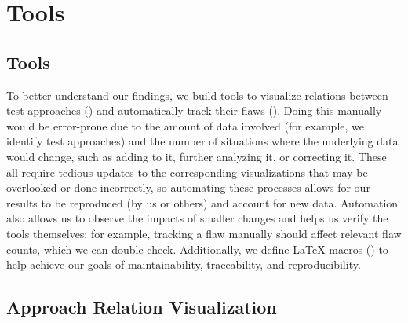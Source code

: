 \ifnotpaper\section{Tools}
\else\subsection{Tools}
\fi\label{tools}

\ifnotpaper
    To better understand our findings, we build tools to
    visualize relations between test approaches () and
    automatically track their flaws (). Doing
    this manually would be error-prone due to the amount of data involved (for
    example, we identify \approachCount{} test approaches) and the number of
    situations where the underlying data would change, such as adding to it,
    further analyzing it, or correcting it. These all require
    tedious updates to the corresponding visualizations that may be overlooked
    or done incorrectly, so automating these processes allows for our results
    to be reproduced (by us or others) and account for new data.
    Automation also allows us to observe the impacts of smaller changes
    and helps us verify the tools themselves; for example,
    tracking a flaw manually should affect relevant flaw counts, which we can
    double-check. Additionally, we define \LaTeX{} macros () to
    help achieve our goals of maintainability, traceability, and reproducibility.

    \subsection{Approach Relation Visualization}\label{app-rel-vis}
\fi

